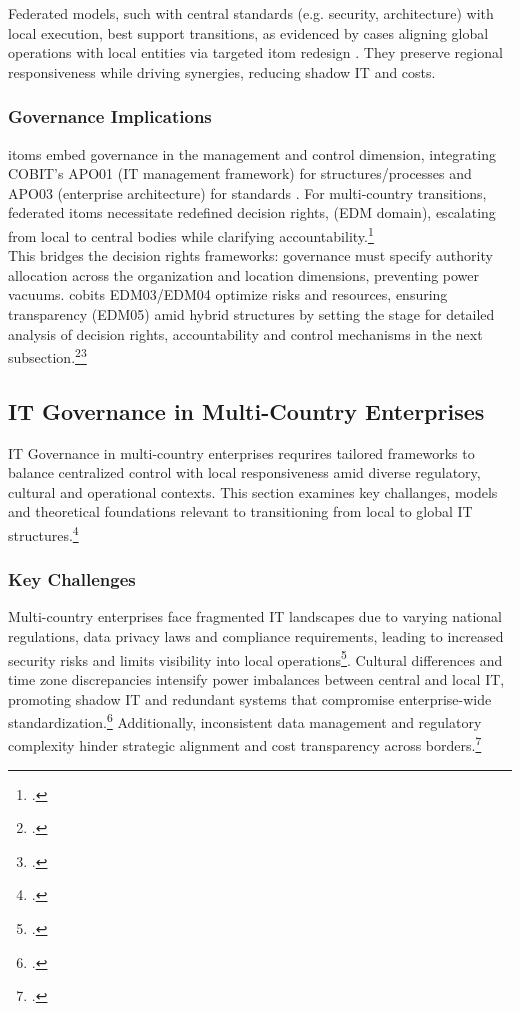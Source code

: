 Federated models, such with central standards (e.g. security, architecture) with local execution, best support transitions, as evidenced by cases aligning global operations with local entities via targeted \ac{itom} redesign \cite[see Kettunen and Winkler (2016)][p.~4]{Suleman2025}.
They preserve regional responsiveness while driving synergies, reducing shadow IT and costs.

\subsubsection{Governance Implications}
\label{subsec:GovernanceImplications}
\ac{itom}s embed governance in the management and control dimension, integrating COBIT's APO01 (IT management framework) for structures/processes and APO03 (enterprise architecture) for standards \cite[23-28,33]{isacaCOBIT2019Framework2018}.
For multi-country transitions, federated \ac{itom}s necessitate redefined decision rights, (\Gls{EDM} domain), escalating from local to central bodies while clarifying accountability.\footcite[55-57]{isacaCOBIT2019Framework2018a}
\\
This bridges the decision rights frameworks: governance must specify authority allocation across the organization and location dimensions, preventing power vacuums.
\ac{cobit}s EDM03/EDM04 optimize risks and resources, ensuring transparency (EDM05) amid hybrid structures by setting the stage for detailed analysis of decision rights, accountability and control mechanisms in the next subsection.\footcite[6-7]{sulemanITOperatingModels2025}\footcite[33]{isacaCOBIT2019Framework2018}

\subsection{IT Governance in Multi-Country Enterprises}
\label{subsec:ITGovernanceInMultiCountryEnterprises}
IT Governance in multi-country enterprises requrires tailored frameworks to balance centralized control with local responsiveness amid diverse regulatory, cultural and operational contexts.
This section examines key challanges, models and theoretical foundations relevant to transitioning from local to global IT structures.\footcite{ionitaITGovernanceGlobal2009}

\subsubsection{Key Challenges}
\label{subsubsec:KeyChallenges}
Multi-country enterprises face fragmented IT landscapes due to varying national regulations, data privacy laws and compliance requirements, leading to increased security risks and limits visibility into local operations\footcite{teamMostCommonIT2026}.
Cultural differences and time zone discrepancies intensify power imbalances between central and local IT, promoting shadow IT and redundant systems that compromise enterprise-wide standardization.\footcite[26]{klotzCausingFactorsOutcomes2019}
Additionally, inconsistent data management and regulatory complexity hinder strategic alignment and cost transparency across borders.\footcite{5ProblemsManaging}

